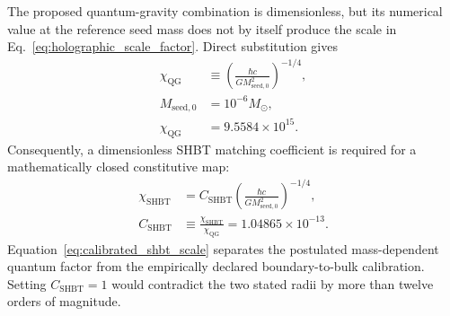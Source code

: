\documentclass[10pt,twocolumn]{IEEEtran}
\newcommand{\Msun}{M_{\odot}}
\begin{document}
The proposed quantum-gravity combination is dimensionless, but its numerical
value at the reference seed mass does not by itself produce the scale in
Eq.~\eqref{eq:holographic_scale_factor}.  Direct substitution gives
\begin{equation}
\begin{aligned}
\chi_{\mathrm{QG}}
&\equiv\left(\frac{\hbar c}
{G M_{\mathrm{seed},0}^{2}}\right)^{-1/4}, \\
M_{\mathrm{seed},0}&=10^{-6}\Msun, \\
\chi_{\mathrm{QG}}&=9.5584\times10^{15}.
\end{aligned}
\label{eq:qg_scale_audit}
\end{equation}
Consequently, a dimensionless SHBT matching coefficient is required for a
mathematically closed constitutive map:
\begin{equation}
\begin{aligned}
\chi_{\mathrm{SHBT}}
&=C_{\mathrm{SHBT}}
\left(\frac{\hbar c}
{G M_{\mathrm{seed},0}^{2}}\right)^{-1/4}, \\
C_{\mathrm{SHBT}}
&\equiv\frac{\chi_{\mathrm{SHBT}}}{\chi_{\mathrm{QG}}}
=1.04865\times10^{-13}.
\end{aligned}
\label{eq:calibrated_shbt_scale}
\end{equation}
Equation~\eqref{eq:calibrated_shbt_scale} separates the postulated
mass-dependent quantum factor from the empirically declared boundary-to-bulk
calibration.  Setting $C_{\mathrm{SHBT}}=1$ would contradict the two stated
radii by more than twelve orders of magnitude.
\end{document}
